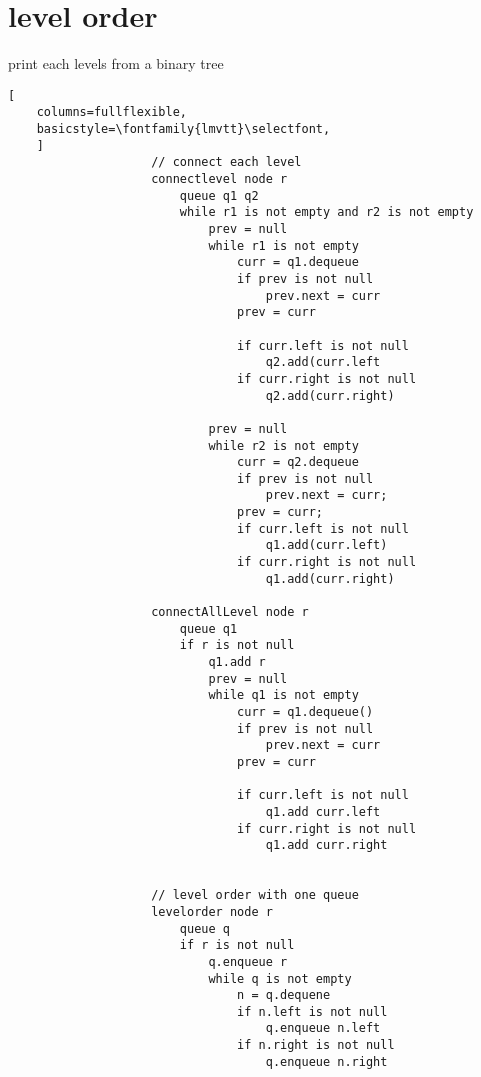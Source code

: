 \documentclass{article}
\begin{document}
\section{level order}
print each levels from a binary tree 
\begin{lstlisting}[
    columns=fullflexible,
    basicstyle=\fontfamily{lmvtt}\selectfont,
    ]
                    // connect each level 
                    connectlevel node r
                        queue q1 q2 
                        while r1 is not empty and r2 is not empty
                            prev = null
                            while r1 is not empty
                                curr = q1.dequeue
                                if prev is not null
                                    prev.next = curr
                                prev = curr

                                if curr.left is not null
                                    q2.add(curr.left
                                if curr.right is not null
                                    q2.add(curr.right)

                            prev = null
                            while r2 is not empty
                                curr = q2.dequeue
                                if prev is not null
                                    prev.next = curr;
                                prev = curr;
                                if curr.left is not null
                                    q1.add(curr.left)
                                if curr.right is not null
                                    q1.add(curr.right)

                    connectAllLevel node r
                        queue q1
                        if r is not null
                            q1.add r
                            prev = null
                            while q1 is not empty
                                curr = q1.dequeue()
                                if prev is not null
                                    prev.next = curr
                                prev = curr

                                if curr.left is not null
                                    q1.add curr.left
                                if curr.right is not null
                                    q1.add curr.right
                        

                    // level order with one queue
                    levelorder node r
                        queue q
                        if r is not null
                            q.enqueue r
                            while q is not empty
                                n = q.dequene
                                if n.left is not null
                                    q.enqueue n.left
                                if n.right is not null
                                    q.enqueue n.right


\end{lstlisting}
\end{document}
